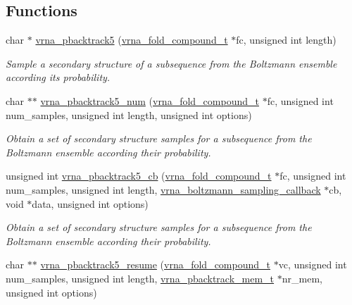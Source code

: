 \subsection*{Functions}
\begin{DoxyCompactItemize}
\item 
char $\ast$ \mbox{\hyperlink{group__subopt__stochbt_ga72ebbe45bcbce147a12f27f62b38db78}{vrna\+\_\+pbacktrack5}} (\mbox{\hyperlink{group__fold__compound_ga1b0cef17fd40466cef5968eaeeff6166}{vrna\+\_\+fold\+\_\+compound\+\_\+t}} $\ast$fc, unsigned int length)
\begin{DoxyCompactList}\small\item\em Sample a secondary structure of a subsequence from the Boltzmann ensemble according its probability. \end{DoxyCompactList}\item 
char $\ast$$\ast$ \mbox{\hyperlink{group__subopt__stochbt_ga30c3ddff868c44eecfdb07d99a2422ba}{vrna\+\_\+pbacktrack5\+\_\+num}} (\mbox{\hyperlink{group__fold__compound_ga1b0cef17fd40466cef5968eaeeff6166}{vrna\+\_\+fold\+\_\+compound\+\_\+t}} $\ast$fc, unsigned int num\+\_\+samples, unsigned int length, unsigned int options)
\begin{DoxyCompactList}\small\item\em Obtain a set of secondary structure samples for a subsequence from the Boltzmann ensemble according their probability. \end{DoxyCompactList}\item 
unsigned int \mbox{\hyperlink{group__subopt__stochbt_ga626beb5b5b962d7e7c8433cd2cfd4e93}{vrna\+\_\+pbacktrack5\+\_\+cb}} (\mbox{\hyperlink{group__fold__compound_ga1b0cef17fd40466cef5968eaeeff6166}{vrna\+\_\+fold\+\_\+compound\+\_\+t}} $\ast$fc, unsigned int num\+\_\+samples, unsigned int length, \mbox{\hyperlink{group__subopt__stochbt_gad5bd9c8b195dd9cde15389f0042f0e44}{vrna\+\_\+boltzmann\+\_\+sampling\+\_\+callback}} $\ast$cb, void $\ast$data, unsigned int options)
\begin{DoxyCompactList}\small\item\em Obtain a set of secondary structure samples for a subsequence from the Boltzmann ensemble according their probability. \end{DoxyCompactList}\item 
char $\ast$$\ast$ \mbox{\hyperlink{group__subopt__stochbt_gac5d7065196975b803daeb4e094ba1cb9}{vrna\+\_\+pbacktrack5\+\_\+resume}} (\mbox{\hyperlink{group__fold__compound_ga1b0cef17fd40466cef5968eaeeff6166}{vrna\+\_\+fold\+\_\+compound\+\_\+t}} $\ast$vc, unsigned int num\+\_\+samples, unsigned int length, \mbox{\hyperlink{group__subopt__stochbt_gaa59c30efbed96bf9aaf8005584c72e63}{vrna\+\_\+pbacktrack\+\_\+mem\+\_\+t}} $\ast$nr\+\_\+mem, unsigned int options)

\end{DoxyCompactItemize}
